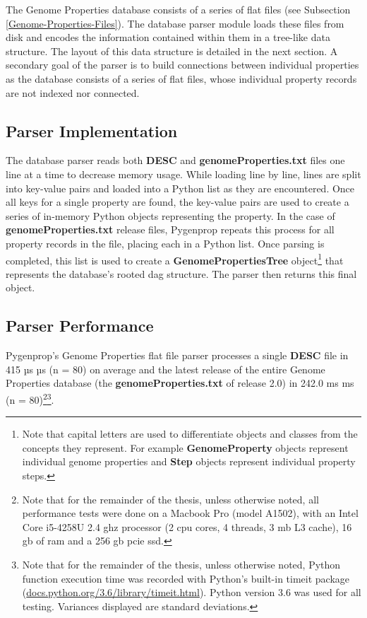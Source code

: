 The Genome Properties database consists of a series of flat files (see 
Subsection \ref{Genome-Properties-Files}). The database parser module loads 
these files from disk and encodes the information contained within them in a 
tree-like data structure. The layout of this data structure is detailed in the 
next section. A secondary goal of the parser is to build connections between 
individual properties as the database consists of a series of flat files, whose 
individual property records are not indexed nor connected. 

\subsection{Parser Implementation}

The database parser reads both \textbf{DESC} and \textbf{genomeProperties.txt} 
files one line at a time to decrease memory usage. While loading line by line, 
lines are split into key-value pairs and loaded into a Python list as they are 
encountered. Once all keys for a single property are found, the key-value pairs 
are used to create a series of in-memory Python objects representing the 
property. In the case of \textbf{genomeProperties.txt} release files, Pygenprop 
repeats this process for all property records in the file, placing each in a 
Python list.  Once parsing is completed, this list is used to create a 
\textbf{GenomePropertiesTree} object\footnote{Note that capital letters are used 
to differentiate objects and classes from the concepts they represent. For 
example \textbf{GenomeProperty} objects represent individual genome properties 
and \textbf{Step} objects represent individual property steps.} that represents 
the database's rooted \gls{dag} structure. The parser then returns this final 
object.

\subsection{Parser Performance}

Pygenprop's Genome Properties flat file parser processes a single \textbf{DESC} 
file in 415 µs  µs (\gls{n} = 80) on average and the latest release of 
the entire Genome Properties database (the \textbf{genomeProperties.txt} of 
release 2.0) in 242.0 ms  ms (\gls{n} = 80)\footnote{Note that for 
the remainder of the thesis, unless otherwise noted, all performance tests were 
done on a Macbook Pro (model A1502), with an Intel Core i5-4258U 2.4 \gls{ghz} 
processor (2 \gls{cpu} cores, 4 threads, 3 \gls{mb} L3 cache), 16 \gls{gb} of 
\gls{ram} and a 256 \gls{gb}  \gls{pcie} \gls{ssd}.}\footnote{Note that for the 
remainder of the thesis, unless otherwise noted, Python function execution time 
was recorded with Python's built-in timeit package 
(\href{http://docs.python.org/3.6/library/timeit.html}{docs.python.org/3.6/library/timeit.html}). 
Python version 3.6 was used for all testing. Variances displayed are standard 
deviations.}.

